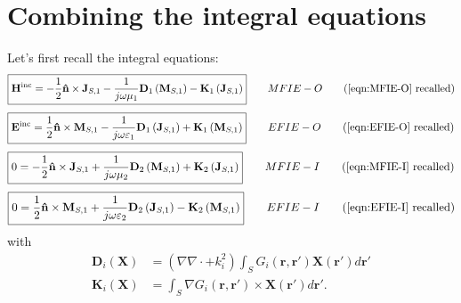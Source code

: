 \documentclass[a4paper,10pt]{book}
\newcommand{\field}[1]{\mathbf{#1}}
\newcommand{\current}[1]{\mathbf{#1}}
\newcommand{\vect}[1]{\mathbf{#1}}
\newcommand{\operator}[1]{\mathbf{#1}}
\begin{document}
\section{Combining the integral equations}
%
\par
Let's first recall the integral equations:
\begin{equation*}
\boxed{
\field{H}^\text{inc} = - \frac{1}{2} \vect{\hat{n}} \times \current{J}_{S,1} - \frac{1}{j \omega \mu_1} \operator{D}_1 \left( \current{M}_{S,1}\right) - \operator{K}_1 \left(\current{J}_{S,1}\right)
} \qquad MFIE-O \tag{\ref{eqn:MFIE-O} recalled}
\end{equation*}
\begin{equation*}
\boxed{
\field{E}^\text{inc} =  \frac{1}{2} \vect{\hat{n}} \times \current{M}_{S,1} - \frac{1}{j \omega \varepsilon_1} \operator{D}_1 \left( \current{J}_{S,1}\right) + \operator{K}_1 \left(\current{M}_{S,1}\right)
} \qquad EFIE-O \tag{\ref{eqn:EFIE-O} recalled}
\end{equation*}
\begin{equation*}
\boxed{
0 = - \frac{1}{2} \vect{\hat{n}} \times \current{J}_{S,1} + \frac{1}{j \omega \mu_2} \operator{D}_2\left(\current{M}_{S,1}\right) +  \operator{K}_2\left( \current{J}_{S,1}\right)
} \qquad MFIE-I \tag{\ref{eqn:MFIE-I} recalled}
\end{equation*}
\begin{equation*}
\boxed{
0 = \frac{1}{2} \vect{\hat{n}} \times \current{M}_{S,1} + \frac{1}{j \omega \varepsilon_2} \operator{D}_2\left(\current{J}_{S,1}\right) -  \operator{K}_2\left( \current{M}_{S,1}\right)
} \qquad EFIE-I \tag{\ref{eqn:EFIE-I} recalled}
\end{equation*}
with
\begin{align*}
\operator{D}_i\left(\current{X}\right) &= \left(\nabla \nabla \cdot + k_i^2\right) \int_{S} G_i\left(\vect{r}, \vect{r}'\right) \current{X}\left(\vect{r}'\right) d\vect{r}' \\
\operator{K}_i\left(\current{X}\right) &= \int_S \nabla G_i\left(\vect{r}, \vect{r}'\right) \times \current{X}\left(\vect{r}'\right) d\vect{r}'.
\end{align*}
\end{document}
